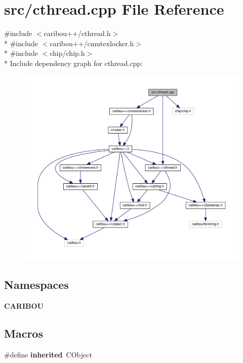 \section{src/cthread.cpp File Reference}
\label{cthread_8cpp}
{\ttfamily \#include $<$caribou++/cthread.\-h$>$}\\*
{\ttfamily \#include $<$caribou++/cmutexlocker.\-h$>$}\\*
{\ttfamily \#include $<$chip/chip.\-h$>$}\\*
Include dependency graph for cthread.\-cpp\-:\nopagebreak
\begin{figure}[H]
\begin{center}
\leavevmode
\includegraphics[width=350pt]{cthread_8cpp__incl}
\end{center}
\end{figure}
\subsection*{Namespaces}
\begin{DoxyCompactItemize}
\item 
{\bf C\-A\-R\-I\-B\-O\-U}
\end{DoxyCompactItemize}
\subsection*{Macros}
\begin{DoxyCompactItemize}
\item 
\#define {\bf inherited}~C\-Object
\end{DoxyCompactItemize}

